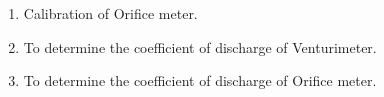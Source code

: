 \documentclass[12pt, a4paper]{article}
\begin{document}
\begin{enumerate}[label=\arabic*.]
                                                                                                                                                                                                                                                                                                                                                                                                                                                                                                                                                                                                                                                                                                                                                                                        \item Calibration of Orifice meter.
                                                                                                                                                                                                                                                                                                                                                                                                                                                                                                                                                                                                                                                                                                                                                                                            \item To determine the coefficient of discharge of Venturimeter.
                                                                                                                                                                                                                                                                                                                                                                                                                                                                                                                                                                                                                                                                                                                                                                                                \item To determine the coefficient of discharge of Orifice meter.

\end{enumerate}
\end{document}

